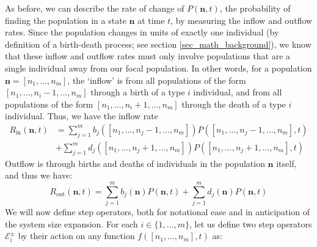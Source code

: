 
As before, we can describe the rate of change of $P(\mathbf{n},t)$, the probability of finding the population in a state $\mathbf{n}$ at time $t$, by measuring the inflow and outflow rates. Since the population changes in units of exactly one individual (by definition of a birth-death process; see section \ref{sec_math_background}), we know that these inflow and outflow rates must only involve populations that are a single individual away from our focal population. In other words, for a population $\mathbf{n} = [n_1,\ldots,n_{m}]$, the `inflow' is from all populations of the form $[n_1,\ldots,n_{i}-1,\dots,n_{m}]$ through a birth of a type $i$ individual, and from all populations of the form $[n_1,\ldots,n_{i}+1,\dots,n_{m}]$ through the death of a type $i$ individual. Thus, we have the inflow rate
\begin{equation}
\label{nD_rate_in}
\begin{split}
R_{\textrm{in}}(\mathbf{n},t) &= \sum\limits_{j=1}^{m}b_{j}([n_1,\ldots,n_{j}-1,\ldots,n_m])P([n_1,\ldots,n_{j}-1,\ldots,n_m],t) \\
& +\sum\limits_{j=1}^{m}d_{j}([n_1,\ldots,n_{j}+1,\ldots,n_m])P([n_1,\ldots,n_{j}+1,\ldots,n_m],t)
\end{split}
\end{equation}
Outflow is through births and deaths of individuals in the population $\mathbf{n}$ itself, and thus we have:
\begin{equation}
\label{nD_rate_out}
R_{\textrm{out}}(\mathbf{n},t) = \sum\limits_{j=1}^{m}b_{j}(\mathbf{n})P(\mathbf{n},t) + \sum\limits_{j=1}^{m}d_{j}(\mathbf{n})P(\mathbf{n},t)
\end{equation}
We will now define step operators, both for notational ease and in anticipation of the system size expansion. For each $i \in \{1,\ldots,m\}$, let us define two step operators $\mathcal{E}_{i}^{\pm}$ by their action on any function $f([n_1,\ldots,n_m],t)$ as:
